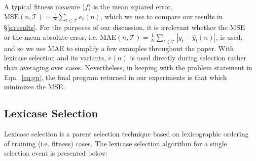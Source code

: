 \documentclass[twoside]{article}
\begin{document}
A typical fitness measure ($f$) is the mean squared error, $\text{MSE}(n,\mathcal{T}) = \frac{1}{N} \sum_{t \in \mathcal{T}}{e_t(n)}$, which we use to compare our results in \S\ref{s:results}. For the purposes of our discussion, it is irrelevant whether the MSE or the mean absolute error, i.e. MAE$(n,\mathcal{T}) = \frac{1}{N} \sum_{t \in \mathcal{T}}{|y_t - \hat{y}_t(n)|}$, is used, and so we use MAE to simplify a few examples throughout the paper. With lexicase selection and its variants, $e(n)$ is used directly during selection rather than averaging over cases. Nevertheless, in keeping with the problem statement in Eqn.~\ref{eq:gp}, the final program returned in our experiments is that which minimizes the MSE.

%

\subsection{Lexicase Selection}\label{s:lex}
Lexicase selection is a parent selection technique based on lexicographic ordering of training (i.e. fitness) cases. The lexicase selection algorithm for a single selection event is presented below: 
\end{document}
